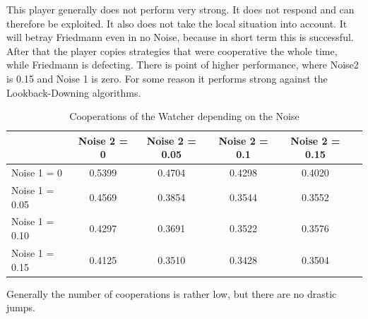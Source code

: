 \documentclass[11pt,twoside]{article}
\begin{document}
This player generally does not perform very strong. It does not respond and can therefore be exploited. It also does not take the local situation into account. It will betray Friedmann even in no Noise, because in short term this is successful. After that the player copies strategies that were cooperative the whole time, while Friedmann is defecting. There is point of higher performance, where Noise2 is 0.15 and Noise 1 is zero. For some reason it performs strong against the Lookback-Downing algorithms.

\begin{table}[h]
 \begin{center}
\caption{Cooperations of the Watcher depending on the Noise} \vspace{3mm}
\begin{tabular}{|l|c|c|c|c|c|}
\hline
   	& Noise 2 = 0 & Noise 2 = 0.05& Noise 2 = 0.1& Noise 2 = 0.15 \\
  \hline
  Noise 1 = 0 	&       0.5399  &  0.4704  &  0.4298 &   0.4020 \\
 \hline
  Noise 1 = 0.05	 &        0.4569  &  0.3854 &   0.3544  & 0.3552 \\
 \hline
  Noise 1 = 0.10 	&         0.4297 &   0.3691  &  0.3522  &  0.3576 \\
 \hline
  Noise 1 = 0.15 	&       0.4125 &   0.3510&    0.3428  &  0.3504 \\
 \hline
\end{tabular}
 \end{center}
\end{table}

Generally the number of cooperations is rather low, but there are no drastic jumps.


\newpage
\end{document}
